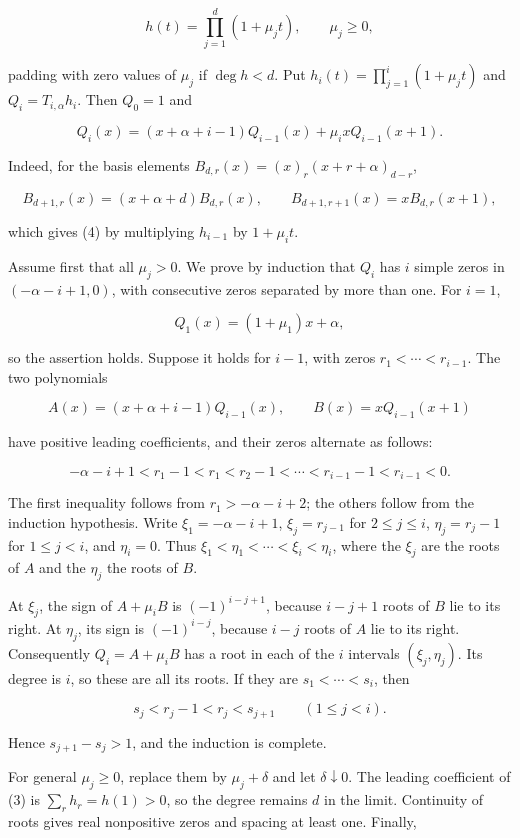 \documentclass[11pt]{article}
\begin{document}
\[
h(t)=\prod_{j=1}^d(1+\mu_jt),\qquad \mu_j\ge0,
\]

padding with zero values of \(\mu_j\) if \(\deg h<d\). Put
\(h_i(t)=\prod_{j=1}^i(1+\mu_jt)\) and \(Q_i=T_{i,\alpha}h_i\). Then
\(Q_0=1\) and

\[
Q_i(x)=(x+\alpha+i-1)Q_{i-1}(x)
       +\mu_i xQ_{i-1}(x+1).
\tag{4}
\]

Indeed, for the basis elements \(B_{d,r}(x)=(x)_r(x+r+\alpha)_{d-r}\),

\[
B_{d+1,r}(x)=(x+\alpha+d)B_{d,r}(x),\qquad
B_{d+1,r+1}(x)=xB_{d,r}(x+1),
\]

which gives (4) by multiplying \(h_{i-1}\) by \(1+\mu_it\).

Assume first that all \(\mu_j>0\). We prove by induction that \(Q_i\)
has \(i\) simple zeros in \((-\alpha-i+1,0)\), with consecutive zeros
separated by more than one. For \(i=1\),

\[
Q_1(x)=(1+\mu_1)x+\alpha,
\]

so the assertion holds. Suppose it holds for \(i-1\), with zeros
\(r_1<\cdots<r_{i-1}\). The two polynomials

\[
A(x)=(x+\alpha+i-1)Q_{i-1}(x),\qquad
B(x)=xQ_{i-1}(x+1)
\]

have positive leading coefficients, and their zeros alternate as
follows:

\[
-\alpha-i+1<r_1-1<r_1<r_2-1<\cdots
<r_{i-1}-1<r_{i-1}<0.
\tag{5}
\]

The first inequality follows from \(r_1>-\alpha-i+2\); the others follow
from the induction hypothesis. Write \(\xi_1=-\alpha-i+1\),
\(\xi_j=r_{j-1}\) for \(2\le j\le i\), \(\eta_j=r_j-1\) for
\(1\le j<i\), and \(\eta_i=0\). Thus
\(\xi_1<\eta_1<\cdots<\xi_i<\eta_i\), where the \(\xi_j\) are the roots
of \(A\) and the \(\eta_j\) the roots of \(B\).

At \(\xi_j\), the sign of \(A+\mu_iB\) is \((-1)^{i-j+1}\), because
\(i-j+1\) roots of \(B\) lie to its right. At \(\eta_j\), its sign is
\((-1)^{i-j}\), because \(i-j\) roots of \(A\) lie to its right.
Consequently \(Q_i=A+\mu_iB\) has a root in each of the \(i\) intervals
\((\xi_j,\eta_j)\). Its degree is \(i\), so these are all its roots. If
they are \(s_1<\cdots<s_i\), then

\[
s_j<r_j-1<r_j<s_{j+1}\qquad(1\le j<i).
\]

Hence \(s_{j+1}-s_j>1\), and the induction is complete.

For general \(\mu_j\ge0\), replace them by \(\mu_j+\delta\) and let
\(\delta\downarrow0\). The leading coefficient of (3) is
\(\sum_r h_r=h(1)>0\), so the degree remains \(d\) in the limit.
Continuity of roots gives real nonpositive zeros and spacing at least
one. Finally,
\end{document}
